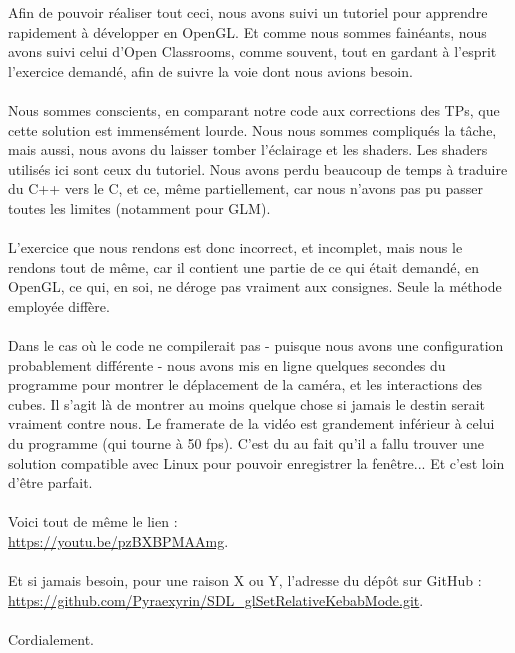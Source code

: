 Afin de pouvoir réaliser tout ceci, nous avons suivi un tutoriel pour apprendre rapidement à développer en OpenGL. Et comme nous sommes fainéants, nous avons suivi celui d'Open Classrooms, comme souvent, tout en gardant à l'esprit l'exercice demandé, afin de suivre la voie dont nous avions besoin.
\\\\
Nous sommes conscients, en comparant notre code aux corrections des TPs, que cette solution est immensément lourde. Nous nous sommes compliqués la tâche, mais aussi, nous avons du laisser tomber l'éclairage et les shaders. Les shaders utilisés ici sont ceux du tutoriel. Nous avons perdu beaucoup de temps à traduire du C++ vers le C, et ce, même partiellement, car nous n'avons pas pu passer toutes les limites (notamment pour GLM).
\\\\
L'exercice que nous rendons est donc incorrect, et incomplet, mais nous le rendons tout de même, car il contient une partie de ce qui était demandé, en OpenGL, ce qui, en soi, ne déroge pas vraiment aux consignes. Seule la méthode employée diffère.
\\\\
Dans le cas où le code ne compilerait pas - puisque nous avons une configuration probablement différente - nous avons mis en ligne quelques secondes du programme pour montrer le déplacement de la caméra, et les interactions des cubes. Il s'agit là de montrer au moins quelque chose si jamais le destin serait vraiment contre nous. Le framerate de la vidéo est grandement inférieur à celui du programme (qui tourne à 50 fps). C'est du au fait qu'il a fallu trouver une solution compatible avec Linux pour pouvoir enregistrer la fenêtre... Et c'est loin d'être parfait.
\\\\
Voici tout de même le lien :\\\href{https://youtu.be/pzBXBPMAAmg}{https://youtu.be/pzBXBPMAAmg}.
\\\\
Et si jamais besoin, pour une raison X ou Y, l'adresse du dépôt sur GitHub :\\\href{https://github.com/Pyraexyrin/SDL\_glSetRelativeKebabMode.git}{https://github.com/Pyraexyrin/SDL\_glSetRelativeKebabMode.git}.
\\\\
Cordialement.
